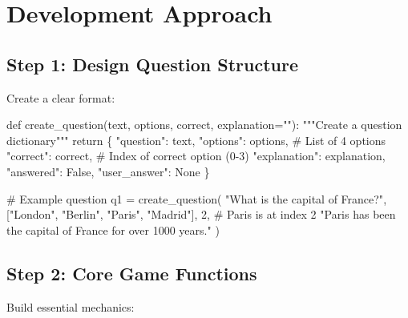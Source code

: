 \documentclass[
  letterpaper,
  DIV=11,
  numbers=noendperiod,
  oneside]{scrreprt}
\newenvironment{Shaded}{}{}
\newcommand{\CommentTok}[1]{\textcolor[rgb]{0.42,0.45,0.49}{#1}}
\newcommand{\ControlFlowTok}[1]{\textcolor[rgb]{0.84,0.23,0.29}{#1}}
\newcommand{\DecValTok}[1]{\textcolor[rgb]{0.00,0.36,0.77}{#1}}
\newcommand{\KeywordTok}[1]{\textcolor[rgb]{0.84,0.23,0.29}{#1}}
\newcommand{\NormalTok}[1]{\textcolor[rgb]{0.14,0.16,0.18}{#1}}
\newcommand{\OperatorTok}[1]{\textcolor[rgb]{0.14,0.16,0.18}{#1}}
\newcommand{\StringTok}[1]{\textcolor[rgb]{0.01,0.18,0.38}{#1}}
\newcommand{\VariableTok}[1]{\textcolor[rgb]{0.89,0.38,0.04}{#1}}
\begin{document}
\section{Development Approach}\label{development-approach-7}

\subsection{Step 1: Design Question
Structure}\label{step-1-design-question-structure}

Create a clear format:

\begin{Shaded}
\begin{Highlighting}[]
\KeywordTok{def}\NormalTok{ create\_question(text, options, correct, explanation}\OperatorTok{=}\StringTok{""}\NormalTok{):}
    \CommentTok{"""Create a question dictionary"""}
    \ControlFlowTok{return}\NormalTok{ \{}
        \StringTok{"question"}\NormalTok{: text,}
        \StringTok{"options"}\NormalTok{: options,  }\CommentTok{\# List of 4 options}
        \StringTok{"correct"}\NormalTok{: correct,  }\CommentTok{\# Index of correct option (0{-}3)}
        \StringTok{"explanation"}\NormalTok{: explanation,}
        \StringTok{"answered"}\NormalTok{: }\VariableTok{False}\NormalTok{,}
        \StringTok{"user\_answer"}\NormalTok{: }\VariableTok{None}
\NormalTok{    \}}

\CommentTok{\# Example question}
\NormalTok{q1 }\OperatorTok{=}\NormalTok{ create\_question(}
    \StringTok{"What is the capital of France?"}\NormalTok{,}
\NormalTok{    [}\StringTok{"London"}\NormalTok{, }\StringTok{"Berlin"}\NormalTok{, }\StringTok{"Paris"}\NormalTok{, }\StringTok{"Madrid"}\NormalTok{],}
    \DecValTok{2}\NormalTok{,  }\CommentTok{\# Paris is at index 2}
    \StringTok{"Paris has been the capital of France for over 1000 years."}
\NormalTok{)}
\end{Highlighting}
\end{Shaded}

\subsection{Step 2: Core Game
Functions}\label{step-2-core-game-functions}

Build essential mechanics:
\end{document}
